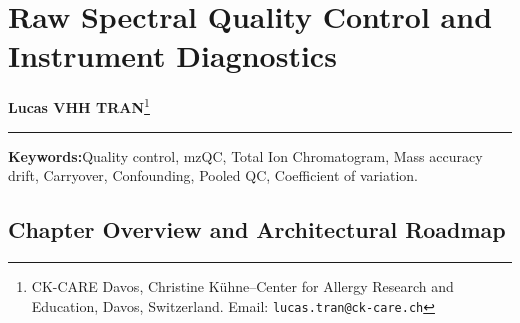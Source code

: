 \documentclass[11pt,twoside,openright]{book}
\begin{document}
\setcounter{chapter}{6}
\chapter{Raw Spectral Quality Control and Instrument Diagnostics}
\label{chap:initial_qc}

\noindent
\textbf{Lucas VHH TRAN}\footnote{CK-CARE Davos, Christine K\"uhne--Center for Allergy Research and Education, Davos, Switzerland. Email: \texttt{lucas.tran@ck-care.ch}}\\
\rule{\textwidth}{0.8pt}

\begin{abstract}
\noindent
Technical artifacts and experimental confounding in mass spectrometry invalidate downstream statistical modeling if left unaddressed \cite{leek2010tackling, goh2017why}. Samples exhibiting spray collapse, progressive retention time shifts, mass calibration drift, or carryover from high-concentration standards must be flagged during acquisition \cite{broadhurst2018guidelines, fda2018bioanalytical}. Experimental designs where biological cohorts are collinear with acquisition batches collapse model degrees of freedom, rendering treatment effects inseparable from technical variance \cite{nygaard2016methods}. In R 4.6.1 and Bioconductor 3.20, quality control auditing operates at two distinct levels: low-level spectral trace extraction using \texttt{Spectra} \cite{gatto2021spectra, gatto2012msnbase} and standardized metric calculation via the \texttt{MsQuality} framework \cite{naake2023msquality} conforming to HUPO-PSI \texttt{mzQC} controlled vocabularies \cite{bittremieux2020mzqc, walzer2014qc}. This chapter details the physical failure modes of liquid chromatography--mass spectrometry (LC-MS) instruments, mathematical formulations for mass accuracy drift and autosampler carryover ratios \cite{booth2011workshop, ema2011bioanalytical}, degrees-of-freedom auditing in design matrices, and empirical coefficient of variation (CV) distributions in pooled quality control samples that set the lower bound for biological effect detection \cite{dunn2011procedures, gika2007quality}.
\end{abstract}

\vspace{1em}
\noindent\textbf{Keywords:}\enspace Quality control, mzQC, Total Ion Chromatogram, Mass accuracy drift, Carryover, Confounding, Pooled QC, Coefficient of variation.

\vspace{1em}
\section*{Chapter Overview and Architectural Roadmap}
\end{document}
